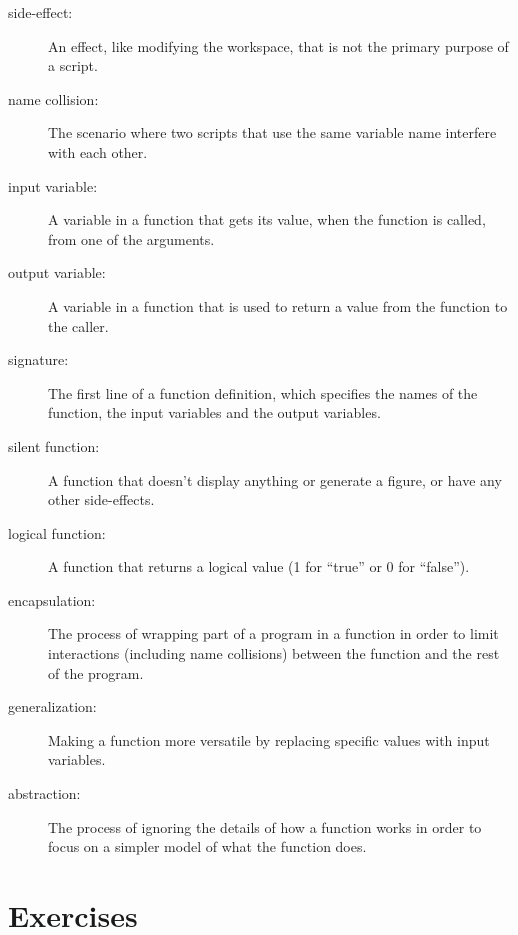 \documentclass[
]{book}
\numberwithin{Answer}{chapter}
\numberwithin{Exercise}{chapter}
\begin{document}
\begin{description}

\item[side-effect:] An effect, like modifying the workspace, that
is not the primary purpose of a script.

\item[name collision:] The scenario where two scripts that use the
same variable name interfere with each other.

\item[input variable:] A variable in a function that gets its value,
when the function is called, from one of the arguments.

\item[output variable:] A variable in a function that is used to
return a value from the function to the caller.

\item[signature:] The first line of a function definition, which
specifies the names of the function, the input variables and the
output variables.

\item[silent function:] A function that doesn't display anything
or generate a figure, or have any other side-effects.

\item[logical function:] A function that returns a logical value
(1 for ``true'' or 0 for ``false'').

\item[encapsulation:] The process of wrapping part of a program in
a function in order to limit interactions (including name collisions)
between the function and the rest of the program.

\item[generalization:] Making a function more versatile by replacing
specific values with input variables.

\item[abstraction:] The process of ignoring the details of how
a function works in order to focus on a simpler model of what the
function does.

\end{description}


\section{Exercises}
\end{document}
